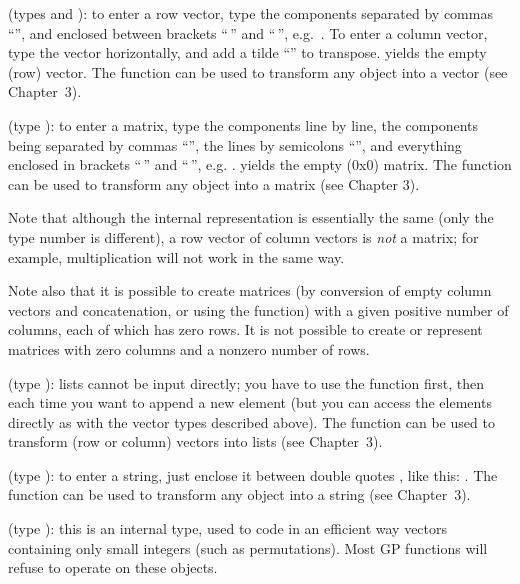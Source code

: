  (types
 and ): to enter a row vector, type the components
separated by commas ``\kbd{,}'', and enclosed between brackets
``\kbd{[}$\,$'' and ``$\,$\kbd{]}'', e.g.~\kbd{[1,2,3]}. To enter a column
vector, type the vector horizontally, and add a tilde ``\til'' to
transpose. \kbd{[ ]} yields the empty (row) vector. The function 
can be used to transform any object into a vector (see Chapter~3).

 (type ): to enter a matrix, type
the components line by line, the components being separated by commas
``\kbd{,}'', the lines by semicolons ``\kbd{;}'', and everything enclosed
in brackets ``\kbd{[}$\,$'' and ``$\,$\kbd{]}'', e.g. \kbd{[x,y; z,t;
u,v]}. \kbd{[ ; ]} yields the empty (0x0) matrix. The function 
can be used to transform any object into a matrix (see Chapter 3).

Note that although the internal representation is essentially the same (only
the type number is different), a row vector of column vectors is \emph{not}
a matrix; for example, multiplication will not work in the same way.

Note also that it is possible to create matrices (by conversion of empty
column vectors and concatenation, or using the  function) with a
given positive number of columns, each of which has zero rows. It is not
possible to create or represent matrices with zero columns and a nonzero
number of rows.

 (type ): lists cannot be input
directly; you have to use the function  first, then
 each time you want to append a new element (but you can
access the elements directly as with the vector types described above). The
function  can be used to transform (row or column) vectors into
lists (see Chapter~3).

 (type ):
to enter a string, just enclose it between double quotes , like
this: . The function  can be used to
transform any object into a string (see Chapter~3).

 (type ): this is an internal type,
used to code in an efficient way vectors containing only small integers (such
as permutations). Most GP functions will refuse to operate on these objects.

